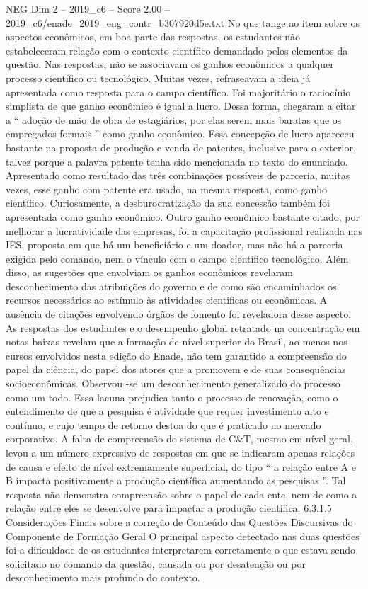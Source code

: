 \begin{textsample}{NEG Dim 2 – 2019\_c6 – Score 2.00 – 2019\_c6/enade\_2019\_eng\_contr\_b307920d5e.txt}
No que tange ao item sobre os aspectos econômicos, em boa parte das respostas, os estudantes não estabeleceram relação com o contexto científico demandado pelos elementos da questão.
Nas respostas, não se associavam os ganhos econômicos a qualquer processo científico ou tecnológico.
Muitas vezes, refraseavam a ideia já apresentada como resposta para o campo científico.
Foi majoritário o raciocínio simplista de que ganho econômico é igual a lucro.
Dessa forma, chegaram a citar a “ adoção de mão de obra de estagiários, por elas serem mais baratas que os empregados formais ” como ganho econômico.
Essa concepção de lucro apareceu bastante na proposta de produção e venda de patentes, inclusive para o exterior, talvez porque a palavra patente tenha sido mencionada no texto do enunciado.
Apresentado como resultado das três combinações possíveis de parceria, muitas vezes, esse ganho com patente era usado, na mesma resposta, como ganho científico.
Curiosamente, a desburocratização da sua concessão também foi apresentada como ganho econômico.
Outro ganho econômico bastante citado, por melhorar a lucratividade das empresas, foi a capacitação profissional realizada nas IES, proposta em que há um beneficiário e um doador, mas não há a parceria exigida pelo comando, nem o vínculo com o campo científico tecnológico.
Além disso, as sugestões que envolviam os ganhos econômicos revelaram desconhecimento das atribuições do governo e de como são encaminhados os recursos necessários ao estímulo às atividades cientificas ou econômicas.
A ausência de citações envolvendo órgãos de fomento foi reveladora desse aspecto.
As respostas dos estudantes e o desempenho global retratado na concentração em notas baixas revelam que a formação de nível superior do Brasil, ao menos nos cursos envolvidos nesta edição do Enade, não tem garantido a compreensão do papel da ciência, do papel dos atores que a promovem e de suas consequências socioeconômicas.
Observou -se um desconhecimento generalizado do processo como um todo.
Essa lacuna prejudica tanto o processo de renovação, como o entendimento de que a pesquisa é atividade que requer investimento alto e contínuo, e cujo tempo de retorno destoa do que é praticado no mercado corporativo.
A falta de compreensão do sistema de C\&T, mesmo em nível geral, levou a um número expressivo de respostas em que se indicaram apenas relações de causa e efeito de nível extremamente superficial, do tipo “ a relação entre A e B impacta positivamente a produção científica aumentando as pesquisas ”.
Tal resposta não demonstra compreensão sobre o papel de cada ente, nem de como a relação entre eles se desenvolve para impactar a produção científica. 6.3.1.5 Considerações Finais sobre a correção de Conteúdo das Questões Discursivas do Componente de Formação Geral O principal aspecto detectado nas duas questões foi a dificuldade de os estudantes interpretarem corretamente o que estava sendo solicitado no comando da questão, causada ou por desatenção ou por desconhecimento mais profundo do contexto.

\end{textsample}

